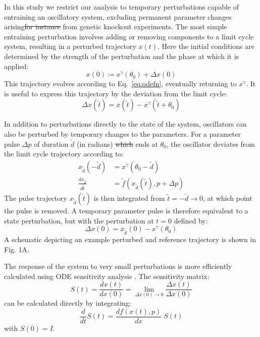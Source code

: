 \documentclass[11pt, letterpaper]{article}
\providecommand{\DIFadd}[1]{{\protect\color{blue}\uwave{#1}}} %
\providecommand{\DIFdel}[1]{{\protect\color{red}\sout{#1}}}                      %
\providecommand{\DIFaddbegin}{} %
\providecommand{\DIFaddend}{} %
\providecommand{\DIFdelbegin}{} %
\providecommand{\DIFdelend}{} %
\begin{document}
In this study we restrict our analysis to temporary perturbations capable of
entraining an oscillatory system, excluding permanent parameter changes arising\DIFdelbegin \DIFdel{for instance }\DIFdelend \DIFaddbegin \DIFadd{,
for instance, }\DIFaddend from genetic knockout experiments. The most simple entraining
perturbation involves adding or removing components to a limit cycle system,
resulting in a perturbed trajectory $x(t)$. Here the initial conditions are
determined by the strength of the perturbation and the phase at which it is
applied:
\begin{equation}
  x(0) \coloneqq x^\gamma(\theta_0) + \Delta x(0)
  \label{eq:stateperturbation}
\end{equation}
This trajectory evolves according to Eq.~\ref{eq:odefn}, eventually returning to
$x^\gamma$. It is useful to express this trajectory by the deviation from the
limit cycle:
\begin{equation}
  \Delta x(\tilde{t}) = x(\tilde{t}) - x^\gamma(\tilde{t} + \theta_0)
  \label{eq:delxt}
\end{equation}

In addition to perturbations directly to the state of the system, oscillators
can also be perturbed by temporary changes to the parameters. For a parameter
pulse $\Delta p$ of duration $\tilde{d}$ (in radians) \DIFdelbegin \DIFdel{which }\DIFdelend \DIFaddbegin \DIFadd{that }\DIFaddend ends at $\theta_0$,
the oscillator deviates from the limit cycle trajectory according to:
\begin{align}
  x_{\tilde{d}}(-\tilde{d}) &= x^\gamma(\theta_0 - \tilde{d}) \\
  \frac{dx_{\tilde{d}}}{d\tilde{t}} &= \tilde{f}(x_{\tilde{d}}(\tilde{t}), p + \Delta p) \label{eq:ode_pert}
\end{align}
The pulse trajectory $x_{\tilde{d}}(\tilde{t})$ is then integrated from
$\tilde{t} = -\tilde{d} \to 0$, at which point the pulse is removed. A temporary
parameter pulse is therefore equivalent to a state perturbation, but with the
perturbation at $t = 0$ defined by:
\begin{equation}
  \Delta x(0) = x_{\tilde{d}}(0) - x^\gamma(\theta_0)
\end{equation}
A schematic depicting an example perturbed and reference trajectory is shown in
Fig. 1A.

The response of the system to very small perturbations is more efficiently
calculated using ODE sensitivity analysis \cite{Rabitz1983}. The sensitivity
matrix:
\begin{equation}
  S(t) = \frac{dx(t)}{dx(0)} = \lim_{\Delta x(0) \to 0}\frac{\Delta x(t)}{\Delta x(0)}
  \label{eq:senslimit}
\end{equation}
can be calculated directly by integrating:
\begin{equation}
  \frac{d}{dt} S(t)  = \frac{df(x(t),p)}{dx}\; S(t)
  \label{eq:odesens}
\end{equation}
with $S(0) = I$.
\end{document}
